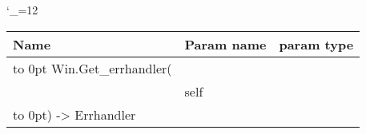 \begingroup \catcode`\_=12 \tt
\begin{tabular}{lll}
\toprule
\textrm{Name}&\textrm{Param name}&\textrm{param type}\\
\midrule
\hbox to 0pt {Win.Get_errhandler(\hss}\\
& self\\
\hbox to 0pt{) -> Errhandler\hss}\\
\bottomrule
\end{tabular}
\endgroup
